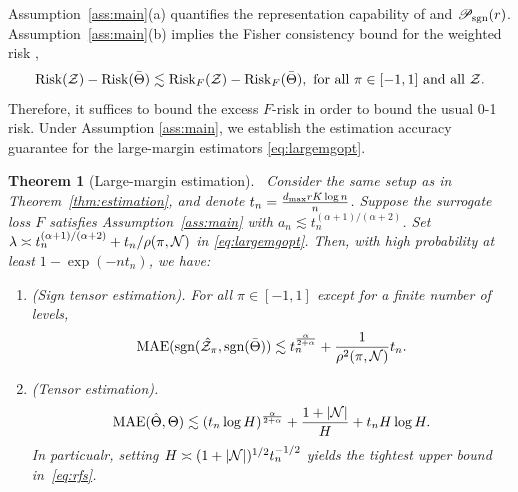 \documentclass[11pt]{article}
\theoremstyle{plain}
\newtheorem{thm}{Theorem}[section]
\theoremstyle{definition}
\def\sign{\textup{sgn}}
\def\caliP{\mathscr{P}_{\textup{sgn}}}
\def\risk{\textup{Risk}}
\begin{document}
\noindent
Assumption~\ref{ass:main}(a) quantifies the representation capability of and $\caliP(r)$.  Assumption~\ref{ass:main}(b) implies the Fisher consistency bound for the weighted risk \citep{scott2011surrogate},
\begin{equation*} \label{eq:fisher}
\risk(\tZ)-\risk(\bar\Theta)\lesssim \risk_{F}(\tZ)-\risk_{F}(\bar\Theta), \text{ for all $\pi\in[-1,1]$ and all $\tZ$}.
\end{equation*}
Therefore, it suffices to bound the excess $F$-risk in order to bound the usual 0-1 risk. Under Assumption \ref{ass:main}, we establish the estimation accuracy guarantee for the large-margin estimators \eqref{eq:largemgopt}. 

\begin{thm}[Large-margin estimation]~\label{thm:extension} 
Consider the same setup as in Theorem~\ref{thm:estimation}, and denote $ t_n={d_{\max}rK\log n \over n}$. Suppose the surrogate loss $F$ satisfies Assumption~\ref{ass:main} with $a_n \lesssim t_n^{(\alpha+1)/(\alpha+2)}$. Set $\lambda\asymp t_n^{(\alpha+1)/(\alpha+2)}+t_n/\rho(\pi,\mathcal{N})$ in \eqref{eq:largemgopt}. Then, with high probability at least $1-\exp(-nt_n)$,  we have:
\begin{enumerate}[label=(\alph*)]
\item (Sign tensor estimation). For all $\pi\in[-1,1]$ except for a finite number of levels,
\begin{equation}\label{eq:sfe}
\textup{MAE}(\sign(\hat \tZ_\pi,\sign(\bar\Theta)) \lesssim t_n ^{\alpha\over 2+\alpha}+{1\over \rho^2(\pi,\tN)}t_n.
\end{equation}

\item (Tensor estimation). 
\begin{equation}\label{eq:rfs}
\textup{MAE}(\hat\Theta,\Theta) \lesssim  \left(t_n\log H\right)^{\alpha \over 2+\alpha}+\frac{1+|\mathcal{N}|}{H}+t_nH\log H.
\end{equation}
In particualr, setting $H\asymp(1+|\mathcal{N}|)^{1/2} t_n^{-1/2}$ yields the tightest upper bound in~\eqref{eq:rfs}.
\end{enumerate}
\end{thm}
\end{document}
